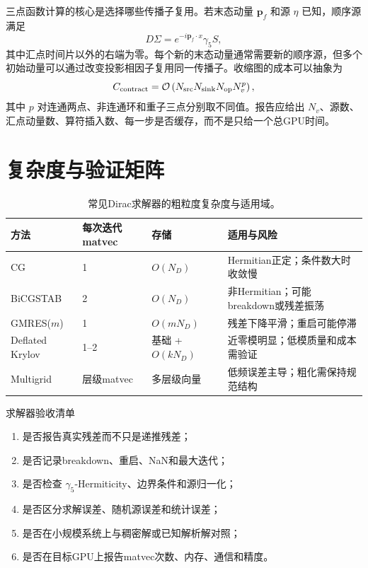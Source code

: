 \documentclass[UTF8,12pt,a4paper,twoside,openany]{ctexbook}
\begin{document}
三点函数计算的核心是选择哪些传播子复用。若末态动量 \(\mathbf p_f\) 和源 \(\eta\) 已知，顺序源满足
\begin{equation}
  D\Sigma=e^{-i\mathbf p_f\cdot x}\gamma_5S,
  \label{eq:seq-source-krylov}
\end{equation}
其中汇点时间片以外的右端为零。每个新的末态动量通常需要新的顺序源，但多个初始动量可以通过改变投影相因子复用同一传播子。收缩图的成本可以抽象为
\begin{equation}
  C_{\rm contract}
  =\mathcal O\left(
  N_{\rm src}N_{\rm sink}N_{\rm op}N_v^p
  \right),
  \label{eq:contraction-cost}
\end{equation}
其中 \(p\) 对连通两点、非连通环和重子三点分别取不同值。报告应给出 \(N_v\)、源数、汇点动量数、算符插入数、每一步是否缓存，而不是只给一个总GPU时间。

\section{复杂度与验证矩阵}

\begin{table}[htbp]
\centering
\caption{常见Dirac求解器的粗粒度复杂度与适用域。}
\label{tab:krylov-comparison}
\small
\begin{tabularx}{\textwidth}{L{2.1cm}L{2.0cm}L{2.6cm}Y}
\toprule
方法 & 每次迭代matvec & 存储 & 适用与风险 \\
\midrule
CG & 1 & \(O(N_D)\) & Hermitian正定；条件数大时收敛慢 \\
BiCGSTAB & 2 & \(O(N_D)\) & 非Hermitian；可能breakdown或残差振荡 \\
GMRES(\(m\)) & 1 & \(O(mN_D)\) & 残差下降平滑；重启可能停滞 \\
Deflated Krylov & 1--2 & 基础 + \(O(kN_D)\) & 近零模明显；低模质量和成本需验证 \\
Multigrid & 层级matvec & 多层级向量 & 低频误差主导；粗化需保持规范结构 \\
\bottomrule
\end{tabularx}
\end{table}

\begin{checkpointbox}{求解器验收清单}
\begin{enumerate}
  \item 是否报告真实残差而不只是递推残差；
  \item 是否记录breakdown、重启、NaN和最大迭代；
  \item 是否检查 \(\gamma_5\)-Hermiticity、边界条件和源归一化；
  \item 是否区分求解误差、随机源误差和统计误差；
  \item 是否在小规模系统上与稠密解或已知解析解对照；
  \item 是否在目标GPU上报告matvec次数、内存、通信和精度。
\end{enumerate}
\end{checkpointbox}
\end{document}
